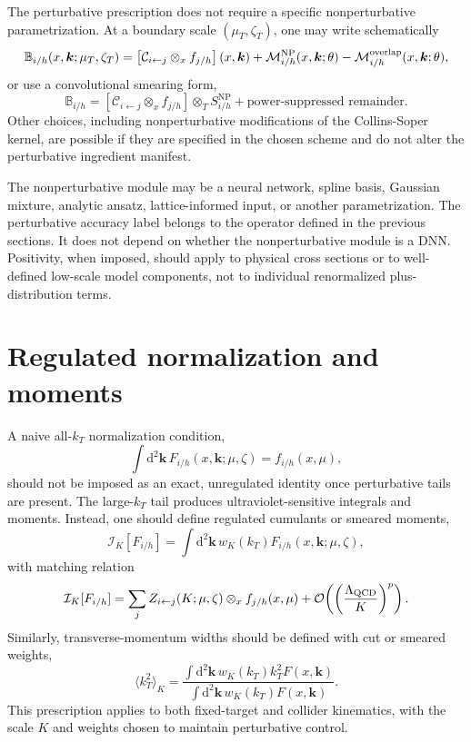 \documentclass[aps,prd,preprint,superscriptaddress,nofootinbib,longbibliography]{revtex4-2}
\newcommand{\dd}{\mathrm d}
\newcommand{\bk}{\bm k}
\newcommand{\ot}{\otimes_T}
\newcommand{\ox}{\otimes_x}
\newcommand{\NP}{\mathrm{NP}}
\newcommand{\order}[1]{\mathcal O\!\left(#1\right)}
\begin{document}
The perturbative prescription does not require a specific nonperturbative parametrization.  At a boundary scale $(\mu_T,\zeta_T)$, one may write schematically
\begin{equation}
  \mathbb B_{i/h}(x,\bk;\mu_T,\zeta_T)
  =\left[\mathcal C_{i\leftarrow j}\ox f_{j/h}\right](x,\bk)
  +\mathcal M_{i/h}^{\NP}(x,\bk;\theta)-\mathcal M_{i/h}^{\rm overlap}(x,\bk;\theta),
  \label{eq:NPadditive}
\end{equation}
or use a convolutional smearing form,
\begin{equation}
  \mathbb B_{i/h}
  =\left[\mathcal C_{i\leftarrow j}\ox f_{j/h}\right]
  \ot S_{i/h}^{\NP}+\text{power-suppressed remainder}.
  \label{eq:NPconv}
\end{equation}
Other choices, including nonperturbative modifications of the Collins-Soper kernel, are possible if they are specified in the chosen scheme and do not alter the perturbative ingredient manifest.

The nonperturbative module may be a neural network, spline basis, Gaussian mixture, analytic ansatz, lattice-informed input, or another parametrization.  The perturbative accuracy label belongs to the operator defined in the previous sections.  It does not depend on whether the nonperturbative module is a DNN.  Positivity, when imposed, should apply to physical cross sections or to well-defined low-scale model components, not to individual renormalized plus-distribution terms.

\section{Regulated normalization and moments}

A naive all-$k_T$ normalization condition,
\begin{equation}
  \int\dd^2\bk\,F_{i/h}(x,\bk;\mu,\zeta)=f_{i/h}(x,\mu),
\end{equation}
should not be imposed as an exact, unregulated identity once perturbative tails are present.  The large-$k_T$ tail produces ultraviolet-sensitive integrals and moments.  Instead, one should define regulated cumulants or smeared moments,
\begin{equation}
  \mathcal I_K[F_{i/h}]
  =\int\dd^2\bk\,w_K(k_T)F_{i/h}(x,\bk;\mu,\zeta),
\end{equation}
with matching relation
\begin{equation}
  \mathcal I_K[F_{i/h}]
  =\sum_j Z_{i\leftarrow j}(K;\mu,\zeta)\ox f_{j/h}(x,\mu)
  +\order{\left(\frac{\Lambda_{\rm QCD}}{K}\right)^p}.
\end{equation}
Similarly, transverse-momentum widths should be defined with cut or smeared weights,
\begin{equation}
  \langle k_T^2\rangle_K
  =\frac{\int\dd^2\bk\,w_K(k_T)k_T^2F(x,\bk)}
  {\int\dd^2\bk\,w_K(k_T)F(x,\bk)}.
\end{equation}
This prescription applies to both fixed-target and collider kinematics, with the scale $K$ and weights chosen to maintain perturbative control.
\end{document}
